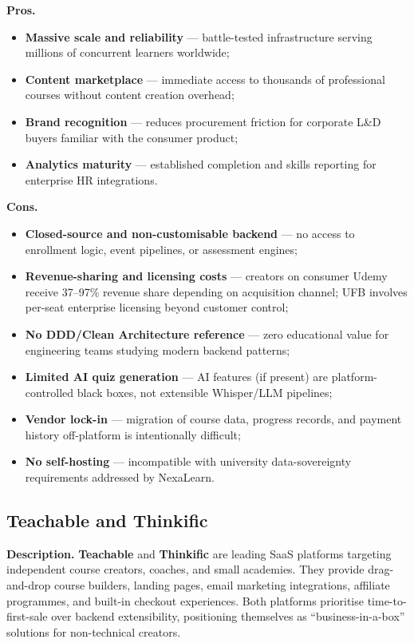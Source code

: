 \textbf{Pros.}
\begin{itemize}
  \item \textbf{Massive scale and reliability} --- battle-tested infrastructure serving millions of concurrent learners worldwide;
  \item \textbf{Content marketplace} --- immediate access to thousands of professional courses without content creation overhead;
  \item \textbf{Brand recognition} --- reduces procurement friction for corporate L\&D buyers familiar with the consumer product;
  \item \textbf{Analytics maturity} --- established completion and skills reporting for enterprise HR integrations.
\end{itemize}

\textbf{Cons.}
\begin{itemize}
  \item \textbf{Closed-source and non-customisable backend} --- no access to enrollment logic, event pipelines, or assessment engines;
  \item \textbf{Revenue-sharing and licensing costs} --- creators on consumer Udemy receive 37--97\% revenue share depending on acquisition channel; UFB involves per-seat enterprise licensing beyond customer control;
  \item \textbf{No DDD/Clean Architecture reference} --- zero educational value for engineering teams studying modern backend patterns;
  \item \textbf{Limited AI quiz generation} --- AI features (if present) are platform-controlled black boxes, not extensible Whisper/LLM pipelines;
  \item \textbf{Vendor lock-in} --- migration of course data, progress records, and payment history off-platform is intentionally difficult;
  \item \textbf{No self-hosting} --- incompatible with university data-sovereignty requirements addressed by NexaLearn.
\end{itemize}

\subsection{Teachable and Thinkific}
\label{subsec:teachable-thinkific}

\textbf{Description.}
\textbf{Teachable} and \textbf{Thinkific} are leading SaaS platforms targeting independent course creators, coaches, and small academies. They provide drag-and-drop course builders, landing pages, email marketing integrations, affiliate programmes, and built-in checkout experiences. Both platforms prioritise time-to-first-sale over backend extensibility, positioning themselves as ``business-in-a-box'' solutions for non-technical creators.

